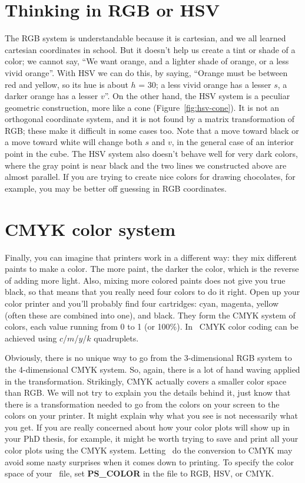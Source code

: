 \section{Thinking in RGB or HSV}
The RGB system is understandable because it is cartesian, and we all
learned cartesian coordinates in school.  But it doesn't help us
create a tint or shade of a color; we cannot say, ``We want orange,
and a lighter shade of orange, or a less vivid orange''.  With HSV we
can do this, by saying, ``Orange must be between red and yellow, so
its hue is about $h$ = 30\DS; a less vivid orange has a lesser
$s$, a darker orange has a lesser $v$''.  On the other hand,
the HSV system is a peculiar geometric construction, more like a cone (Figure~\ref{fig:hsv-cone}). It is not an
orthogonal coordinate system, and it is not found by a matrix
transformation of RGB; these make it difficult in some cases too.
Note that a move toward black or a move toward white will change both
$s$ and $v$, in the general case of an interior point in the
cube. The HSV system also doesn't behave well for very dark colors,
where the gray point is near black and the two lines we constructed
above are almost parallel.  If you are trying to create nice colors
for drawing chocolates, for example, you may be better off guessing
in RGB coordinates.

\section{CMYK color system}
Finally, you can imagine that printers work in a different way: they mix different paints to make a color. The more paint, the darker the color, which is the reverse of adding more light. Also, mixing more colored paints does not give you true black, so that means that you really need four colors to do it right. Open up your color printer and you'll probably find four cartridges: cyan, magenta, yellow (often these are combined into one), and black. They form the CMYK system of colors, each value running from 0 to 1 (or 100\%). In \GMT\ CMYK color coding can be achieved using $c$/$m$/$y$/$k$ quadruplets.

Obviously, there is no unique way to go from the 3-dimensional RGB system to the 4-dimensional CMYK system. So, again, there is a lot of hand waving applied in the transformation. Strikingly, CMYK actually covers a smaller color space than RGB. We will not try to explain you the details behind it, just know that there is a transformation needed to go from the colors on your screen to the colors on your printer. It might explain why what you see is not necessarily what you get. If you are really concerned about how your color plots will show up in your PhD thesis, for example, it might be worth trying to save and print all your color plots using the CMYK system. Letting \GMT\ do the conversion to CMYK may avoid
some nasty surprises when it comes down to printing. To specify the color space of your \PS\ file, set \textbf{PS\_COLOR} in the  file to RGB, HSV, or CMYK.
